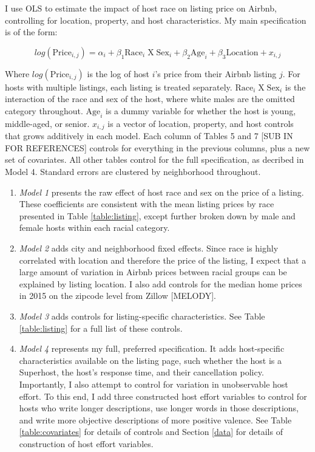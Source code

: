 \label{empirical}

I use OLS to estimate the impact of host race on listing price on Airbnb, controlling for location, property, and host characteristics. My main specification is of the form:

\[ log(\text{Price}_{i,j}) = \alpha_i + \beta_1 \text{Race}_{i} \;  \text{X} \; \text{Sex}_i + \beta_2 \text{Age}_i + \beta_3 \text{Location} +  x_{i,j} \]

Where $log(\text{Price}_{i,j})$ is the log of host $i$'s price from their Airbnb listing $j$. For hosts with multiple listings, each listing is treated separately. $\text{Race}_{i} \;  \text{X} \; \text{Sex}_i$ is the interaction of the race and sex of the host, where white males are the omitted category throughout. $\text{Age}_i$ is a dummy variable for whether the host is young, middle-aged, or senior. $x_{i,j}$ is a vector of location, property, and host controls that grows additively in each model. Each column of Tables 5 and 7 [SUB IN FOR REFERENCES] controls for everything in the previous columns, plus a new set of covariates. All other tables control for the full specification, as decribed in Model 4. Standard errors are clustered by neighborhood throughout.

\begin{enumerate}
	\item \textit{Model 1} presents the raw effect of host race and sex on the price of a listing. These coefficients are consistent with the mean listing prices by race presented in Table \ref{table:listing}, except further broken down by male and female hosts within each racial category.
	
	\item \textit{Model 2} adds city and neighborhood fixed effects. Since race is highly correlated with location and therefore the price of the listing, I expect that a large amount of variation in Airbnb prices between racial groups can be explained by listing location. I also add controls for the median home prices in 2015 on the zipcode level from Zillow [MELODY].  
	
	\item \textit{Model 3} adds controls for listing-specific characteristics. See Table \ref{table:listing} for a full list of these controls. 
	
	\item \textit{Model 4} represents my full, preferred specification. It adds host-specific characteristics available on the listing page, such whether the host is a Superhost, the host's response time, and their cancellation policy. Importantly, I also attempt to control for variation in unobservable host effort. To this end, I add three constructed host effort variables to control for hosts who write longer descriptions, use longer words in those descriptions, and write more objective descriptions of more positive valence. See Table \ref{table:covariates} for details of controls and Section \ref{data} for details of construction of host effort variables. 
\end{enumerate}





